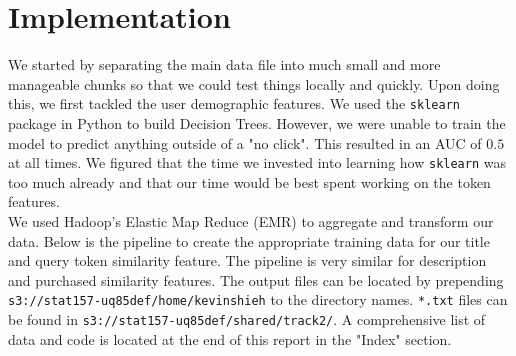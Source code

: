 \documentclass[11pt]{article}
\begin{document}
\section*{Implementation}
We started by separating the main data file into much small and more manageable chunks so that we could test things locally and quickly. Upon doing this, we first tackled the user demographic features. We used the \verb|sklearn| package in Python to build Decision Trees. However, we were unable to train the model to predict anything outside of a "no click". This resulted in an AUC of $0.5$ at all times. We figured that the time we invested into learning how \verb|sklearn| was too much already and that our time would be best spent working on the token features. \\

We used Hadoop's Elastic Map Reduce (EMR) to aggregate and transform our data. Below is the pipeline to create the appropriate training data for our title and query token similarity feature. The pipeline is very similar for description and purchased similarity features. The output files can be located by prepending \texttt{s3://stat157-uq85def/home/kevinshieh} to the directory names. \texttt{*.txt} files can be found in \texttt{s3://stat157-uq85def/shared/track2/}. A comprehensive list of data and code is located at the end of this report in the "Index" section. \\
\end{document}
